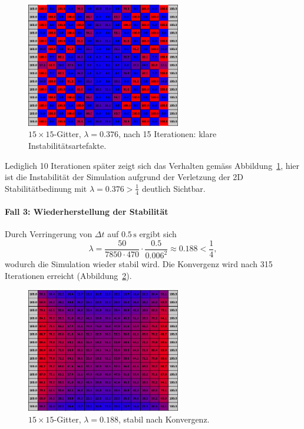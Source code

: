 \begin{figure}[htbp]
	\centering
	\includegraphics[width=0.6\textwidth]{papers/parallelisierung/images/simulation_15x15_0.376_15it.pdf}
	\caption{\(15\times 15\)-Gitter, \(\lambda = 0.376\), nach 15 Iterationen: klare Instabilitätsartefakte.}
	\label{parallelisierung:fig:simulation_15x15_0.376_15it}
\end{figure}

Lediglich 10 Iterationen später zeigt sich das Verhalten gemäss Abbildung~\ref{parallelisierung:fig:simulation_15x15_0.376_15it}, hier ist die Instabilität der Simulation aufgrund der Verletzung der 2D Stabilitätbedinung mit \(\lambda = 0.376 > \frac{1}{4}\) deutlich Sichtbar.

\paragraph{Fall 3: Wiederherstellung der Stabilität}  
Durch Verringerung von \(\Delta t\) auf \(0.5\,\mathrm{s}\) ergibt sich
\[
\lambda =
\frac{50}{7850 \cdot 470} \cdot \frac{0.5}{0.006^2}
\approx 0.188 < \frac14,
\]
wodurch die Simulation wieder stabil wird. Die Konvergenz wird nach 315 Iterationen erreicht (Abbildung~\ref{parallelisierung:fig:simulation_15x15_0.188_konv}).

\begin{figure}[htbp]
	\centering
	\includegraphics[width=0.6\textwidth]{papers/parallelisierung/images/simulation_15x15_0.188_konv.pdf}
	\caption{\(15\times 15\)-Gitter, \(\lambda = 0.188\), stabil nach Konvergenz.}
	\label{parallelisierung:fig:simulation_15x15_0.188_konv}
\end{figure}


